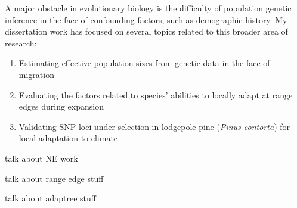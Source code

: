\renewcommand{\thepage}{Dissertation Summary}


\indent A major obstacle in evolutionary biology is the difficulty of population genetic inference in the face of confounding factors, such as demographic history. My dissertation work has focused on several topics related to this broader area of research:
\begin{enumerate}[nolistsep]
\item Estimating effective population sizes from genetic data in the face of migration
\item Evaluating the factors related to species' abilities to locally adapt at range edges during expansion
\item Validating SNP loci under selection in lodgepole pine (\emph{Pinus contorta}) for local adaptation to climate
\end{enumerate}

talk about NE work

talk about range edge stuff

talk about adaptree stuff
